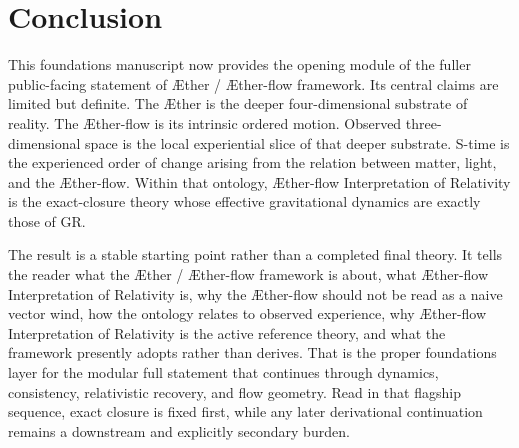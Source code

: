 \documentclass[11pt]{article}
\newcommand{\Aether}{\AE{}ther}
\newcommand{\Aflow}{\AE{}ther-flow}
\newcommand{\TheoryName}{\Aflow{} Interpretation of Relativity}
\newcommand{\TheoryProgram}{\Aether{} / \Aflow{} framework}
\begin{document}
\section{Conclusion}

This foundations manuscript now provides the opening module of the fuller public-facing statement of \TheoryProgram{}. Its central claims are limited but definite. The \Aether{} is the deeper four-dimensional substrate of reality. The \Aflow{} is its intrinsic ordered motion. Observed three-dimensional space is the local experiential slice of that deeper substrate. S-time is the experienced order of change arising from the relation between matter, light, and the \Aflow{}. Within that ontology, \TheoryName{} is the exact-closure theory whose effective gravitational dynamics are exactly those of GR.

The result is a stable starting point rather than a completed final theory. It tells the reader what the \TheoryProgram{} is about, what \TheoryName{} is, why the \Aflow{} should not be read as a naive vector wind, how the ontology relates to observed experience, why \TheoryName{} is the active reference theory, and what the framework presently adopts rather than derives. That is the proper foundations layer for the modular full statement that continues through dynamics, consistency, relativistic recovery, and flow geometry. Read in that flagship sequence, exact closure is fixed first, while any later derivational continuation remains a downstream and explicitly secondary burden.


\end{document}
